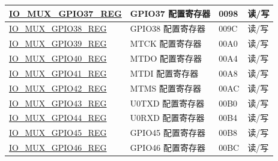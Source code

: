 \documentclass[main.tex]{subfiles}
\begin{document}
\begin{longtable}{ | p{5cm} | p{7.5cm} | p{2cm} | p{1cm} | }
\hyperref[regdesc:IOMUXnREG]{IO\_MUX\_GPIO37\_REG} & GPIO37 配置寄存器 & \hexprefix{}0098 & 读/写 \\ \hline
\hyperref[regdesc:IOMUXnREG]{IO\_MUX\_GPIO38\_REG} & GPIO38 配置寄存器 & \hexprefix{}009C & 读/写 \\ \hline
\hyperref[regdesc:IOMUXnREG]{IO\_MUX\_GPIO39\_REG} & MTCK 配置寄存器 & \hexprefix{}00A0 & 读/写 \\ \hline
\hyperref[regdesc:IOMUXnREG]{IO\_MUX\_GPIO40\_REG} & MTDO 配置寄存器 & \hexprefix{}00A4 & 读/写 \\ \hline
\hyperref[regdesc:IOMUXnREG]{IO\_MUX\_GPIO41\_REG} & MTDI 配置寄存器 & \hexprefix{}00A8 & 读/写 \\ \hline
\hyperref[regdesc:IOMUXnREG]{IO\_MUX\_GPIO42\_REG} & MTMS 配置寄存器 & \hexprefix{}00AC & 读/写 \\ \hline
\hyperref[regdesc:IOMUXnREG]{IO\_MUX\_GPIO43\_REG} & U0TXD 配置寄存器 & \hexprefix{}00B0 & 读/写 \\ \hline
\hyperref[regdesc:IOMUXnREG]{IO\_MUX\_GPIO44\_REG} & U0RXD 配置寄存器 & \hexprefix{}00B4 & 读/写 \\ \hline
\hyperref[regdesc:IOMUXnREG]{IO\_MUX\_GPIO45\_REG} & GPIO45 配置寄存器 & \hexprefix{}00B8 & 读/写 \\ \hline
\hyperref[regdesc:IOMUXnREG]{IO\_MUX\_GPIO46\_REG} & GPIO46 配置寄存器 & \hexprefix{}00BC & 读/写 \\ \hline
\end{longtable}
\end{document}
